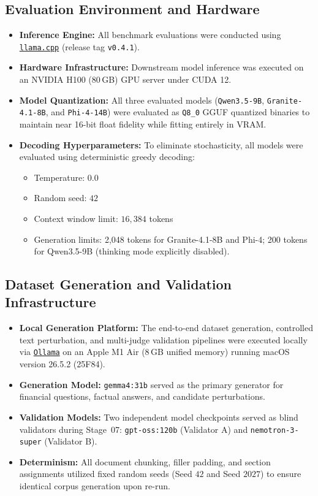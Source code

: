 \documentclass[11pt,letterpaper]{article}
\begin{document}
\subsection{Evaluation Environment and Hardware}
\begin{itemize}
    \item \textbf{Inference Engine:} All benchmark evaluations were conducted using \href{https://github.com/ggml-org/llama.cpp}{\texttt{llama.cpp}} (release tag \texttt{v0.4.1}).
    \item \textbf{Hardware Infrastructure:} Downstream model inference was executed on an NVIDIA H100 (80\,GB) GPU server under CUDA 12.
    \item \textbf{Model Quantization:} All three evaluated models (\texttt{Qwen3.5-9B}, \texttt{Granite-4.1-8B}, and \texttt{Phi-4-14B}) were evaluated as \texttt{Q8\_0} GGUF quantized binaries to maintain near 16-bit float fidelity while fitting entirely in VRAM.
    \item \textbf{Decoding Hyperparameters:} To eliminate stochasticity, all models were evaluated using deterministic greedy decoding:
    \begin{itemize}
        \item Temperature: $0.0$
        \item Random seed: $42$
        \item Context window limit: $16{,}384$ tokens
        \item Generation limits: 2,048 tokens for Granite-4.1-8B and Phi-4; 200 tokens for Qwen3.5-9B (thinking mode explicitly disabled).
    \end{itemize}
\end{itemize}

\subsection{Dataset Generation and Validation Infrastructure}
\begin{itemize}
    \item \textbf{Local Generation Platform:} The end-to-end dataset generation, controlled text perturbation, and multi-judge validation pipelines were executed locally via \href{https://ollama.com}{\texttt{Ollama}} on an Apple M1 Air (8\,GB unified memory) running macOS version 26.5.2 (25F84).
    \item \textbf{Generation Model:} \texttt{gemma4:31b} served as the primary generator for financial questions, factual answers, and candidate perturbations.
    \item \textbf{Validation Models:} Two independent model checkpoints served as blind validators during Stage~07: \texttt{gpt-oss:120b} (Validator A) and \texttt{nemotron-3-super} (Validator B).
    \item \textbf{Determinism:} All document chunking, filler padding, and section assignments utilized fixed random seeds (Seed $42$ and Seed $2027$) to ensure identical corpus generation upon re-run.
\end{itemize}
\end{document}
